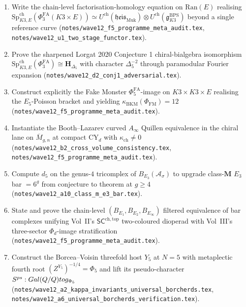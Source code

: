 \documentclass[11pt]{article}
\providecommand{\Q}{\mathbb{Q}}
\providecommand{\Sp}{\mathrm{Sp}}
\providecommand{\kch}{\kappa_{\mathrm{ch}}}
\providecommand{\kBKM}{\kappa_{\mathrm{BKM}}}
\providecommand{\Eone}{E_1}
\providecommand{\Etwo}{E_2}
\providecommand{\Ethree}{E_3}
\providecommand{\Einf}{E_\infty}
\providecommand{\fg}{\mathfrak{g}}
\providecommand{\fheis}{\mathfrak{heis}}
\providecommand{\Phifa}{\Phi^{\mathrm{FA}}}
\begin{document}
\begin{enumerate}[leftmargin=2em]

\item Write the chain-level factorisation-homology equation on
$\mathrm{Ran}(E)$ realising $\Sp^{\mathrm{ch}}_{K3, E}(\Phifa_3(K3 \times E))
\simeq U^{\mathrm{ch}}(\fheis_{\mathrm{Muk}}) \otimes U^{\mathrm{ch}}(\fg^{\mathrm{BPS}}_{K3})$
beyond a single reference curve
(\texttt{notes/wave12\_f5\_programme\_meta\_audit.tex},
\texttt{notes/wave12\_u1\_two\_stage\_functor.tex}).

\item Prove the sharpened Lorgat 2020 Conjecture 1 chiral-bialgebra
isomorphism $\Sp^{\mathrm{ch}}_{K3, E}(\Phifa_3) \cong \mathbf{H}_{\Delta_5}$
with character $\Delta_5^{-2}$ through paramodular Fourier expansion
(\texttt{notes/wave12\_d2\_conj1\_adversarial.tex}).

\item Construct explicitly the Fake Monster $\Phifa_5$-image on
$K3 \times K3 \times E$ realising the $E_5$-Poisson bracket and
yielding $\kBKM(\Phi_{\mathrm{FM}}) = 12$
(\texttt{notes/wave12\_f5\_programme\_meta\_audit.tex}).

\item Instantiate the Booth--Lazarev curved $A_\infty$ Quillen
equivalence in the chiral lane on $\overline{M}_{g, n}$ at compact
CY$_d$ with $\kch \neq 0$
(\texttt{notes/wave12\_b2\_cross\_volume\_consistency.tex},
\texttt{notes/wave12\_f5\_programme\_meta\_audit.tex}).

\item Compute $d_5$ on the genus-$4$ tricomplex of
$B_{\Ethree}(\mathcal{A}_\sigma)$ to upgrade class-$\mathbf{M}$
$\Ethree$ bar $= 6^g$ from conjecture to theorem at $g \geq 4$
(\texttt{notes/wave12\_a10\_class\_m\_e3\_bar.tex}).

\item State and prove the chain-level
$(B_{\Eone}, B_{\Etwo}, B_{\Einf})$ filtered equivalence of bar
complexes unifying Vol~II's
$\mathsf{SC}^{\mathrm{ch, top}}$ two-coloured dioperad with Vol~III's
three-sector $\Phi_d$-image stratification
(\texttt{notes/wave12\_f5\_programme\_meta\_audit.tex}).

\item Construct the Borcea--Voisin threefold host $Y_5$ at $N = 5$
with metaplectic fourth root $(Z^{Y_5})^{-1/4} = \Phi_5$ and lift its
pseudo-character $S^{\mathrm{ps}}: \mathrm{Gal}(\bar\Q/\Q) \to
\fg_{\Phi_5}$
(\texttt{notes/wave12\_a2\_kappa\_invariants\_universal\_borcherds.tex},
\texttt{notes/wave12\_a6\_universal\_borcherds\_verification.tex}).


\end{enumerate}
\end{document}
